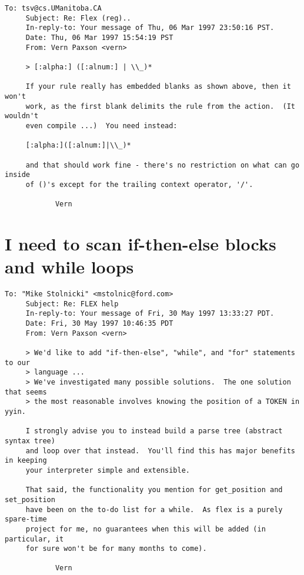 \documentclass[openany,oneside]{book}
\begin{document}
\begin{verbatim}
To: tsv@cs.UManitoba.CA
     Subject: Re: Flex (reg)..
     In-reply-to: Your message of Thu, 06 Mar 1997 23:50:16 PST.
     Date: Thu, 06 Mar 1997 15:54:19 PST
     From: Vern Paxson <vern>
     
     > [:alpha:] ([:alnum:] | \\_)*
     
     If your rule really has embedded blanks as shown above, then it won't
     work, as the first blank delimits the rule from the action.  (It wouldn't
     even compile ...)  You need instead:
     
     [:alpha:]([:alnum:]|\\_)*
     
     and that should work fine - there's no restriction on what can go inside
     of ()'s except for the trailing context operator, '/'.
     
     		Vern
\end{verbatim}

\section{I need to scan if-then-else blocks and while loops}

\begin{verbatim}
To: "Mike Stolnicki" <mstolnic@ford.com>
     Subject: Re: FLEX help
     In-reply-to: Your message of Fri, 30 May 1997 13:33:27 PDT.
     Date: Fri, 30 May 1997 10:46:35 PDT
     From: Vern Paxson <vern>
     
     > We'd like to add "if-then-else", "while", and "for" statements to our
     > language ...
     > We've investigated many possible solutions.  The one solution that seems
     > the most reasonable involves knowing the position of a TOKEN in yyin.
     
     I strongly advise you to instead build a parse tree (abstract syntax tree)
     and loop over that instead.  You'll find this has major benefits in keeping
     your interpreter simple and extensible.
     
     That said, the functionality you mention for get_position and set_position
     have been on the to-do list for a while.  As flex is a purely spare-time
     project for me, no guarantees when this will be added (in particular, it
     for sure won't be for many months to come).
     
     		Vern
\end{verbatim}
\end{document}
